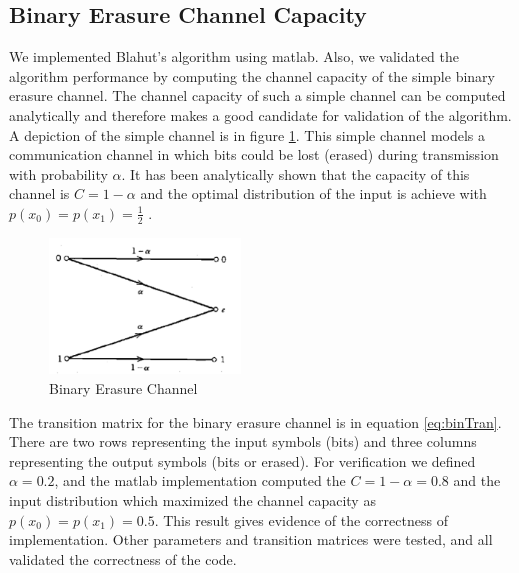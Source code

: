 \documentclass[journal]{IEEEtran}
\begin{document}
\subsection{Binary Erasure Channel Capacity}
\par We implemented Blahut's algorithm using matlab. Also, we validated the algorithm performance by computing the channel capacity of the simple binary erasure channel. The channel capacity of such a simple channel can be computed analytically and therefore makes a good candidate for validation of the algorithm. A depiction of the simple channel is in figure \ref{im:erasure}. This simple channel models a communication channel in which bits could be lost (erased) during transmission with probability \begin{math}\alpha\end{math}. It has been analytically shown that the capacity of this channel is \begin{math}C = 1-\alpha\end{math} and the optimal distribution of the input is achieve with \begin{math}p(x_0) = p(x_1) = \frac{1}{2}\end{math} \cite[p.~88-189]{cover}.

\begin{figure}[h]
\centering
\includegraphics[width=2in]{../images/binaryErasureChannel.png}
\caption{Binary Erasure Channel}
\label{im:erasure}
\end{figure}

\par The transition matrix for the binary erasure channel is in equation \ref{eq:binTran}. There are two rows representing the input symbols (bits) and three columns representing the output symbols (bits or erased). For verification we defined \begin{math}\alpha = 0.2\end{math}, and the matlab implementation computed the \begin{math}C = 1 - \alpha = 0.8\end{math} and the input distribution which maximized the channel capacity as \begin{math}p(x_0) = p(x_1) = 0.5\end{math}. This result gives evidence of the correctness of implementation. Other parameters and transition matrices were tested, and all validated the correctness of the code.
\end{document}
